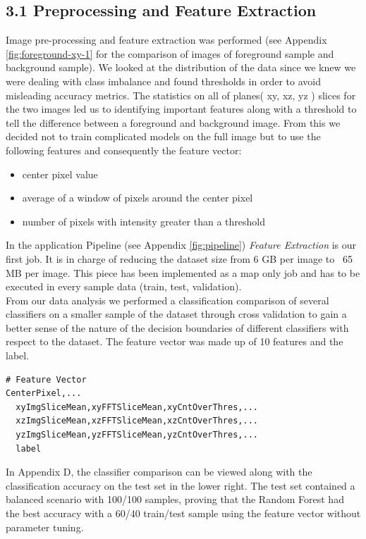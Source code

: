 \documentclass{neu_handout}
\begin{document}
\subsection*{3.1 Preprocessing and Feature Extraction}
Image pre-processing and feature extraction was performed (see Appendix \ref{fig:foreground-xy-1} for the comparison of images of foreground sample and background sample). We looked at the distribution of the data since we knew we were dealing with class imbalance and found thresholds in order to avoid misleading accuracy metrics. The statistics on all of planes( xy, xz, yz ) slices for the two images led us to identifying important features along with a threshold to tell the difference between a foreground and background image. From this we decided not to train complicated models on the full image but to use the following features and consequently the feature vector:

\begin{itemize}
\setlength\itemsep{0.2em}
\item center pixel value
\item average of a window of pixels around the center pixel
\item number of pixels with intensity greater than a threshold
\end{itemize}

In the application Pipeline (see Appendix \ref{fig:pipeline}) \textit{Feature Extraction} is our first job. It is in charge of reducing the dataset size from 6 GB per image to ~65 MB per image. This piece has been implemented as a map only job and has to be executed in every sample data (train, test, validation). \\

From our data analysis we performed a classification comparison of several classifiers on a smaller sample of the dataset through cross validation to gain a better sense of the nature of the decision boundaries of different classifiers with respect to the dataset. The feature vector was made up of 10 features and the label.

\begin{lstlisting}
# Feature Vector
CenterPixel,...
  xyImgSliceMean,xyFFTSliceMean,xyCntOverThres,...
  xzImgSliceMean,xzFFTSliceMean,xzCntOverThres,...
  yzImgSliceMean,yzFFTSliceMean,yzCntOverThres,...
  label
\end{lstlisting}

In Appendix D, the classifier comparison can be viewed along with the classification accuracy on the test set in the lower right. The test set contained a balanced scenario with 100/100 samples, proving that the Random Forest had the best accuracy with a 60/40 train/test sample using the feature vector without parameter tuning.
\end{document}

